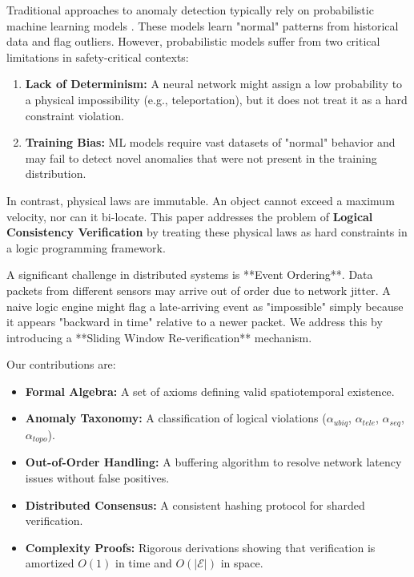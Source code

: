\documentclass[conference]{IEEEtran}
\begin{document}
Traditional approaches to anomaly detection typically rely on probabilistic machine learning models \cite{b1}. These models learn "normal" patterns from historical data and flag outliers. However, probabilistic models suffer from two critical limitations in safety-critical contexts:
\begin{enumerate}
    \item \textbf{Lack of Determinism:} A neural network might assign a low probability to a physical impossibility (e.g., teleportation), but it does not treat it as a hard constraint violation.
    \item \textbf{Training Bias:} ML models require vast datasets of "normal" behavior and may fail to detect novel anomalies that were not present in the training distribution.
\end{enumerate}

In contrast, physical laws are immutable. An object cannot exceed a maximum velocity, nor can it bi-locate. This paper addresses the problem of \textbf{Logical Consistency Verification} by treating these physical laws as hard constraints in a logic programming framework.

A significant challenge in distributed systems is **Event Ordering**. Data packets from different sensors may arrive out of order due to network jitter. A naive logic engine might flag a late-arriving event as "impossible" simply because it appears "backward in time" relative to a newer packet. We address this by introducing a **Sliding Window Re-verification** mechanism.

Our contributions are:
\begin{itemize}
    \item \textbf{Formal Algebra:} A set of axioms defining valid spatiotemporal existence.
    \item \textbf{Anomaly Taxonomy:} A classification of logical violations ($\alpha_{ubiq}$, $\alpha_{tele}$, $\alpha_{seq}$, $\alpha_{topo}$).
    \item \textbf{Out-of-Order Handling:} A buffering algorithm to resolve network latency issues without false positives.
    \item \textbf{Distributed Consensus:} A consistent hashing protocol for sharded verification.
    \item \textbf{Complexity Proofs:} Rigorous derivations showing that verification is amortized $O(1)$ in time and $O(|\mathcal{E}|)$ in space.
\end{itemize}
\end{document}
